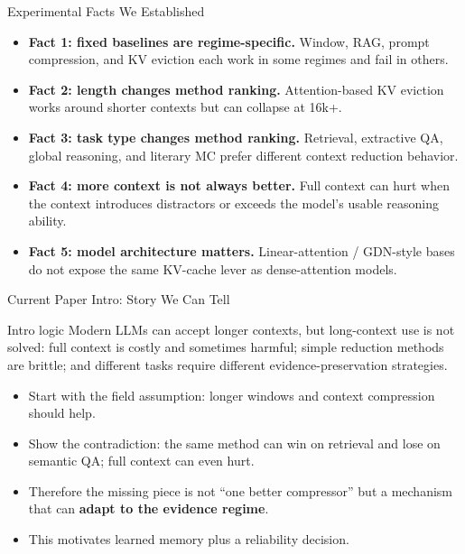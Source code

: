 \begin{frame}{Experimental Facts We Established}
  \small
  \begin{itemize}
    \item \textbf{Fact 1: fixed baselines are regime-specific.} Window, RAG,
      prompt compression, and KV eviction each work in some regimes and fail in others.
    \item \textbf{Fact 2: length changes method ranking.} Attention-based KV
      eviction works around shorter contexts but can collapse at 16k+.
    \item \textbf{Fact 3: task type changes method ranking.} Retrieval,
      extractive QA, global reasoning, and literary MC prefer different context
      reduction behavior.
    \item \textbf{Fact 4: more context is not always better.} Full context can
      hurt when the context introduces distractors or exceeds the model's usable reasoning ability.
    \item \textbf{Fact 5: model architecture matters.} Linear-attention / GDN-style
      bases do not expose the same KV-cache lever as dense-attention models.
  \end{itemize}
\end{frame}

\begin{frame}{Current Paper Intro: Story We Can Tell}
  \small
  \begin{block}{Intro logic}
    Modern LLMs can accept longer contexts, but long-context use is not solved:
    full context is costly and sometimes harmful; simple reduction methods are brittle;
    and different tasks require different evidence-preservation strategies.
  \end{block}
  \begin{itemize}
    \item Start with the field assumption: longer windows and context compression should help.
    \item Show the contradiction: the same method can win on retrieval and lose on semantic QA; full context can even hurt.
    \item Therefore the missing piece is not ``one better compressor'' but a
      mechanism that can \textbf{adapt to the evidence regime}.
    \item This motivates learned memory plus a reliability decision.
  \end{itemize}
\end{frame}

